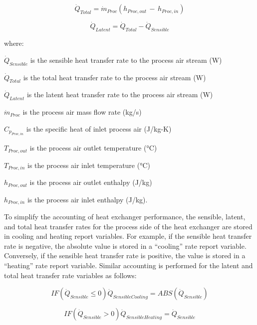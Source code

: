 \begin{equation}
{\dot{Q}_{Total}} = {\dot{m}_{Proc}}\left( {{h_{Proc,out}}\, - \,{h_{Proc,in}}} \right)
\end{equation}

\begin{equation}
{\dot{Q}_{Latent}} = {\dot{Q}_{Total}} - {\dot{Q}_{Sensible}}
\end{equation}

where:

\({\dot{Q}_{Sensible}}\) is the sensible heat transfer rate to the process air stream (W)

\({\dot{Q}_{Total}}\) is the total heat transfer rate to the process air stream (W)

\({\dot{Q}_{Latent}}\) is the latent heat transfer rate to the process air stream (W)

\({\dot{m}_{Proc}}\) is the process air mass flow rate (kg/s)

\({C_{p_{Proc,in}}}\) is the specific heat of inlet process air (J/kg-K)

\({T_{Proc,out}}\) is the process air outlet temperature (°C)

\({T_{Proc,in}}\) is the process air inlet temperature (°C)

\({h_{Proc,out}}\) is the process air outlet enthalpy (J/kg)

\({h_{Proc,in}}\) is the process air inlet enthalpy (J/kg).

To simplify the accounting of heat exchanger performance, the sensible, latent, and total heat transfer rates for the process side of the heat exchanger are stored in cooling and heating report variables. For example, if the sensible heat transfer rate is negative, the absolute value is stored in a ``cooling'' rate report variable. Conversely, if the sensible heat transfer rate is positive, the value is stored in a ``heating'' rate report variable. Similar accounting is performed for the latent and total heat transfer rate variables as follows:

\begin{equation}
IF \left( {{{\dot{Q}_{Sensible}}} \leq 0} \right) {\dot{Q}_{SensibleCooling}} = ABS\left( {\dot{Q}_{Sensible}} \right)
\end{equation}

\begin{equation}
IF \left( {{\dot{Q}_{Sensible}} > 0} \right){\dot{Q}_{SensibleHeating}} = {\dot{Q}_{Sensible}}
\end{equation}

